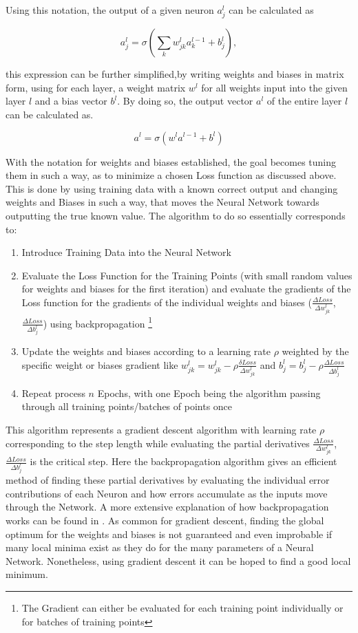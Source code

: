  Using this notation, the output of a given neuron $a_j^l$ can be calculated as 
 
 $$
 a_j^l = \sigma\left( \sum_k w_{jk}^l a_k^{l-1} + b_j^l \right),
 $$
 
 this expression can be further simplified,by writing weights and biases in matrix form, using for each layer, a weight matrix $w^l$ for all weights input into the given layer $l$ and a bias vector $b^l$. By doing so, the output vector $a^l$ of the entire layer $l$ can be calculated as.
 
 $$a^l = \sigma (w^la^{l-1}+b^l)$$
 
With the notation for weights and biases established, the goal becomes tuning them in such a way, as to minimize a chosen Loss function as discussed above. This is done by using training data with a known correct output and changing weights and Biases in such a way, that moves the Neural Network towards outputting the true known value. 
The algorithm to do so essentially corresponds to: 

\begin{enumerate}
	\item Introduce Training Data into the Neural Network
	\item Evaluate the Loss Function for the Training Points (with small random values for weights and biases for the first iteration) and evaluate the gradients of the Loss function for the gradients of the individual weights and biases ($\frac{\Delta Loss}{\Delta w_{jk}^l}$, $\frac{\Delta Loss}{\Delta b_j^l}$) using backpropagation  \footnote{The Gradient can either be evaluated for each training point individually or for batches of training points}
	\item Update the weights and biases according to a learning rate $\rho$ weighted by the specific weight or biases gradient like $w_{jk}^l =w_{jk}^l - \rho \frac{\delta Loss}{\Delta w_{jk}^l}$ and $b_j^l =b_j^l - \rho \frac{\Delta Loss}{\Delta b_j^l}$ 
	\item Repeat process $n$ Epochs, with one Epoch being the algorithm passing through all training points/batches of points once
\end{enumerate}

This algorithm represents a gradient descent algorithm with learning rate  $\rho$ corresponding to the step length while evaluating the partial derivatives $\frac{\Delta Loss}{\Delta w_{jk}^l}$, $\frac{\Delta Loss}{\Delta b_j^l}$ is the critical step. Here the backpropagation algorithm gives an efficient method of finding these partial derivatives by evaluating the individual error contributions of each Neuron and how errors accumulate as the inputs move through the Network. A more extensive explanation of how backpropagation works can be found in \cite{nielsen2015neuralChap2}. As common for gradient descent, finding the global optimum for the weights and biases is not guaranteed and even improbable if many local minima exist as they do for the many parameters of a Neural Network. Nonetheless, using gradient descent it can be hoped to find a good local minimum.   \cite{James2023} \cite{nielsen2015neuralChap2}


